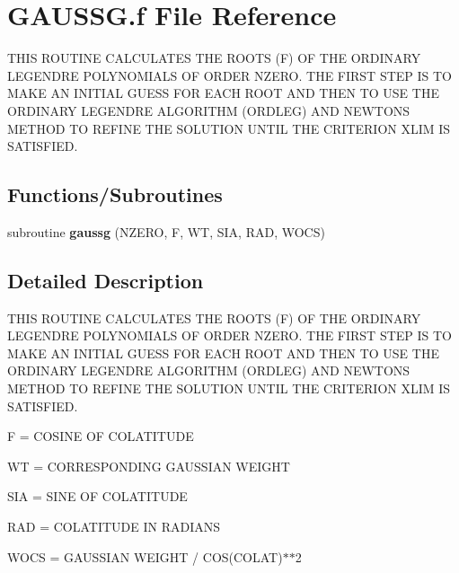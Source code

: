 \hypertarget{GAUSSG_8f}{}\section{G\+A\+U\+S\+S\+G.\+f File Reference}
\label{GAUSSG_8f}


T\+H\+I\+S R\+O\+U\+T\+I\+N\+E C\+A\+L\+C\+U\+L\+A\+T\+E\+S T\+H\+E R\+O\+O\+T\+S (F) O\+F T\+H\+E O\+R\+D\+I\+N\+A\+R\+Y L\+E\+G\+E\+N\+D\+R\+E P\+O\+L\+Y\+N\+O\+M\+I\+A\+L\+S O\+F O\+R\+D\+E\+R N\+Z\+E\+R\+O. T\+H\+E F\+I\+R\+S\+T S\+T\+E\+P I\+S T\+O M\+A\+K\+E A\+N I\+N\+I\+T\+I\+A\+L G\+U\+E\+S\+S F\+O\+R E\+A\+C\+H R\+O\+O\+T A\+N\+D T\+H\+E\+N T\+O U\+S\+E T\+H\+E O\+R\+D\+I\+N\+A\+R\+Y L\+E\+G\+E\+N\+D\+R\+E A\+L\+G\+O\+R\+I\+T\+H\+M (O\+R\+D\+L\+E\+G) A\+N\+D N\+E\+W\+T\+O\+N\+S M\+E\+T\+H\+O\+D T\+O R\+E\+F\+I\+N\+E T\+H\+E S\+O\+L\+U\+T\+I\+O\+N U\+N\+T\+I\+L T\+H\+E C\+R\+I\+T\+E\+R\+I\+O\+N X\+L\+I\+M I\+S S\+A\+T\+I\+S\+F\+I\+E\+D.  


\subsection*{Functions/\+Subroutines}
\begin{DoxyCompactItemize}
\item 
\hypertarget{GAUSSG_8f_afb105d9f6308d466a4caffeb6d6fbf7b}{}subroutine {\bfseries gaussg} (N\+Z\+E\+R\+O, F, W\+T, S\+I\+A, R\+A\+D, W\+O\+C\+S)\label{GAUSSG_8f_afb105d9f6308d466a4caffeb6d6fbf7b}

\end{DoxyCompactItemize}


\subsection{Detailed Description}
T\+H\+I\+S R\+O\+U\+T\+I\+N\+E C\+A\+L\+C\+U\+L\+A\+T\+E\+S T\+H\+E R\+O\+O\+T\+S (F) O\+F T\+H\+E O\+R\+D\+I\+N\+A\+R\+Y L\+E\+G\+E\+N\+D\+R\+E P\+O\+L\+Y\+N\+O\+M\+I\+A\+L\+S O\+F O\+R\+D\+E\+R N\+Z\+E\+R\+O. T\+H\+E F\+I\+R\+S\+T S\+T\+E\+P I\+S T\+O M\+A\+K\+E A\+N I\+N\+I\+T\+I\+A\+L G\+U\+E\+S\+S F\+O\+R E\+A\+C\+H R\+O\+O\+T A\+N\+D T\+H\+E\+N T\+O U\+S\+E T\+H\+E O\+R\+D\+I\+N\+A\+R\+Y L\+E\+G\+E\+N\+D\+R\+E A\+L\+G\+O\+R\+I\+T\+H\+M (O\+R\+D\+L\+E\+G) A\+N\+D N\+E\+W\+T\+O\+N\+S M\+E\+T\+H\+O\+D T\+O R\+E\+F\+I\+N\+E T\+H\+E S\+O\+L\+U\+T\+I\+O\+N U\+N\+T\+I\+L T\+H\+E C\+R\+I\+T\+E\+R\+I\+O\+N X\+L\+I\+M I\+S S\+A\+T\+I\+S\+F\+I\+E\+D. 

F = C\+O\+S\+I\+N\+E O\+F C\+O\+L\+A\+T\+I\+T\+U\+D\+E

W\+T = C\+O\+R\+R\+E\+S\+P\+O\+N\+D\+I\+N\+G G\+A\+U\+S\+S\+I\+A\+N W\+E\+I\+G\+H\+T

S\+I\+A = S\+I\+N\+E O\+F C\+O\+L\+A\+T\+I\+T\+U\+D\+E

R\+A\+D = C\+O\+L\+A\+T\+I\+T\+U\+D\+E I\+N R\+A\+D\+I\+A\+N\+S

W\+O\+C\+S = G\+A\+U\+S\+S\+I\+A\+N W\+E\+I\+G\+H\+T / C\+O\+S(\+C\+O\+L\+A\+T)$\ast$$\ast$2 